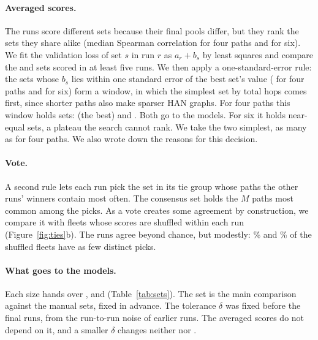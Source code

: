 

\paragraph{Averaged scores.} The runs score different sets because their final pools differ, but
they rank the sets they share alike (median Spearman correlation  for four paths
and  for six). We fit the validation loss of set $s$ in run $r$ as $a_r + b_s$
by least squares and compare the  and  sets scored in
at least five runs. We then apply a one-standard-error rule: the sets whose $b_s$ lies within one
standard error of the best set's value ( for four paths and  for
six) form a window, in which the simplest set by total hops comes first, since shorter paths also
make sparser HAN graphs. For four paths this window holds  sets:  (the
best) and . Both go to the models. For six it holds  near-equal sets,
a plateau the search cannot rank. We take the two simplest, as many as for four paths. We also wrote
down the reasons for this decision.

\paragraph{Vote.} A second rule lets each run pick the set in its tie group whose paths the other
runs' winners contain most often. The consensus set  holds the $M$ paths most common among
the picks. As a vote creates some agreement by construction, we compare it with
 fleets whose scores are shuffled within each run (Figure~\ref{fig:ties}b).
The runs agree beyond chance, but modestly: \% and
\% of the shuffled fleets have as few distinct picks.

\paragraph{What goes to the models.} Each size hands over ,  and 
(Table~\ref{tab:sets}). The set  is the main comparison against the manual sets, fixed in
advance. The tolerance $\delta$ was fixed before the final runs, from the run-to-run noise of
earlier runs. The averaged scores do not depend on it, and a smaller $\delta$ changes neither
 nor .

